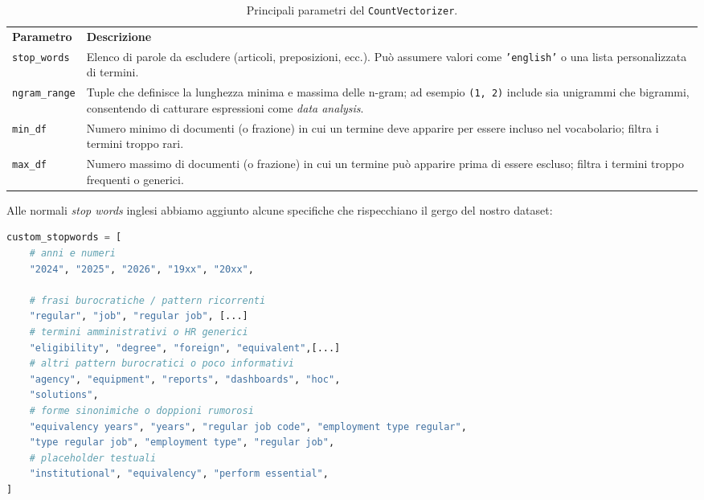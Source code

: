 \begin{table}[H]
\centering
\begin{tabular}{p{3cm} p{9cm}}
\textbf{Parametro} & \textbf{Descrizione} \\
\texttt{stop\_words} & Elenco di parole da escludere (articoli, preposizioni, ecc.). Può assumere valori come \texttt{'english'} o una lista personalizzata di termini. \\
\texttt{ngram\_range} & Tuple che definisce la lunghezza minima e massima delle n-gram; ad esempio \texttt{(1, 2)} include sia unigrammi che bigrammi, consentendo di catturare espressioni come \textit{data analysis}. \\
\texttt{min\_df} & Numero minimo di documenti (o frazione) in cui un termine deve apparire per essere incluso nel vocabolario; filtra i termini troppo rari. \\
\texttt{max\_df} & Numero massimo di documenti (o frazione) in cui un termine può apparire prima di essere escluso; filtra i termini troppo frequenti o generici. \\
\end{tabular}
\caption{Principali parametri del \texttt{CountVectorizer}.}
\end{table}

\noindent Alle normali \emph{stop words} inglesi abbiamo aggiunto alcune specifiche che rispecchiano il gergo del nostro dataset:

\begin{lstlisting}[language=Python]
custom_stopwords = [
    # anni e numeri
    "2024", "2025", "2026", "19xx", "20xx",

    # frasi burocratiche / pattern ricorrenti
    "regular", "job", "regular job", [...]
    # termini amministrativi o HR generici
    "eligibility", "degree", "foreign", "equivalent",[...]
    # altri pattern burocratici o poco informativi
    "agency", "equipment", "reports", "dashboards", "hoc",
    "solutions",
    # forme sinonimiche o doppioni rumorosi
    "equivalency years", "years", "regular job code", "employment type regular",
    "type regular job", "employment type", "regular job",
    # placeholder testuali
    "institutional", "equivalency", "perform essential",
]
\end{lstlisting}

